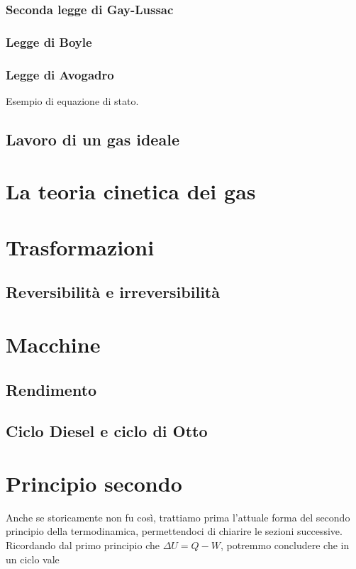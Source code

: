\subsubsection*{Seconda legge di Gay-Lussac}
\subsubsection*{Legge di Boyle}

\subsubsection*{Legge di Avogadro}
Esempio di equazione di stato.

\subsection{Lavoro di un gas ideale}

\section{La teoria cinetica dei gas}


\section{Trasformazioni}


\subsection{Reversibilità e irreversibilità}

\section{Macchine}

\subsection{Rendimento}
\subsection{Ciclo Diesel e ciclo di Otto}


\section{Principio secondo}
Anche se storicamente non fu così, trattiamo prima l'attuale forma
del secondo principio della termodinamica, permettendoci di chiarire
le sezioni successive. Ricordando dal primo principio che $\Delta U =
Q - W$, potremmo concludere che in un ciclo vale

